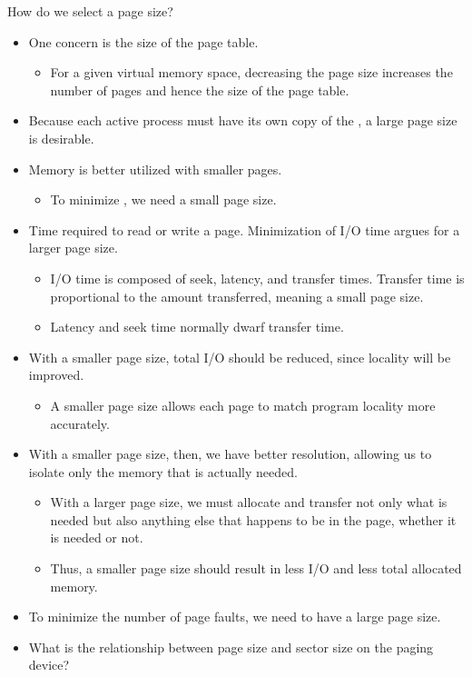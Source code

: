 How do we select a page size?
\begin{itemize}[noitemsep]
\item One concern is the size of the page table.
  \begin{itemize}[noitemsep]
  \item For a given virtual memory space, decreasing the page size increases the number of pages and hence the size of the page table.
  \end{itemize}

\item Because each active process must have its own copy of the , a large page size is desirable.

\item Memory is better utilized with smaller pages.
  \begin{itemize}[noitemsep]
  \item To minimize , we need a small page size.
  \end{itemize}

\item Time required to read or write a page.
  Minimization of I/O time argues for a larger page size.
  \begin{itemize}[noitemsep]
  \item I/O time is composed of seek, latency, and transfer times.
    Transfer time is proportional to the amount transferred, meaning a small page size.
  \item Latency and seek time normally dwarf transfer time.
  \end{itemize}

\item With a smaller page size, total I/O should be reduced, since locality will be improved.
  \begin{itemize}[noitemsep]
  \item A smaller page size allows each page to match program locality more accurately.
\end{itemize}

\item With a smaller page size, then, we have better resolution, allowing us to isolate only the memory that is actually needed.
  \begin{itemize}[noitemsep]
  \item With a larger page size, we must allocate and transfer not only what is needed but also anything else that happens to be in the page, whether it is needed or not.
  \item Thus, a smaller page size should result in less I/O and less total allocated memory.
\end{itemize}
\item To minimize the number of page faults, we need to have a large page size.

\item What is the relationship between page size and sector size on the paging device?
\end{itemize}


